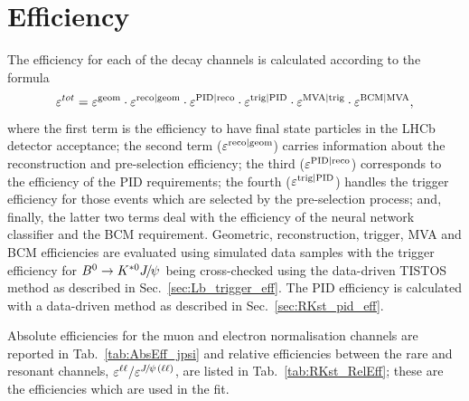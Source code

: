 \section{Efficiency}
\label{sec:RKst_efficiency}

The efficiency for each of the decay channels is calculated according to the formula
%
$$\varepsilon^{tot} = \varepsilon^{\rm geom} \cdot \varepsilon^{\rm reco|geom} \cdot \varepsilon^{\rm PID|reco} \cdot \varepsilon^{\rm trig|PID} \cdot \varepsilon^{\rm MVA|trig}\cdot \varepsilon^{\rm BCM|MVA},$$
%
where the first term is the efficiency to have final state particles in the LHCb detector 
acceptance; the second term ($\varepsilon^{\rm reco|geom}$) carries information about the reconstruction and pre-selection efficiency;
the third ($\varepsilon^{\rm PID|reco}$) corresponds to the efficiency of the PID requirements;
the fourth ($\varepsilon^{\rm trig|PID}$) handles the trigger efficiency for those events which are selected by the pre-selection 
process; and, finally, the latter two terms deal with the efficiency of the neural network classifier and the BCM requirement.
Geometric, reconstruction, trigger, MVA and BCM efficiencies are evaluated using simulated data samples with the trigger efficiency
for $\Bz\to\Kstarz\jpsi$ being cross-checked using the data-driven TISTOS method as described in Sec.~\ref{sec:Lb_trigger_eff}.
The PID efficiency is calculated with a data-driven method as described in Sec.~\ref{sec:RKst_pid_eff}.

Absolute efficiencies for the muon and electron normalisation channels are reported in Tab.~\ref{tab:AbsEff_jpsi}
and relative efficiencies between the rare and resonant channels, 
$\varepsilon^{\ell\ell}/\varepsilon^{\jpsi(\ell\ell)}$, are listed in Tab.~\ref{tab:RKst_RelEff};
these are the efficiencies which are used in the fit.

%
%
%
%

